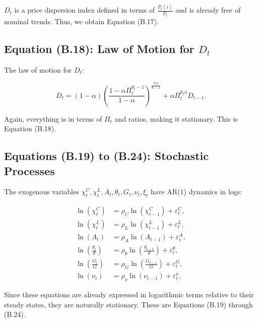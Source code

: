 \documentclass[12pt]{article}
\begin{document}
\( D_t \) is a price dispersion index defined in terms of \( \frac{P_t(i)}{P_t} \) and is already free of nominal trends. Thus, we obtain Equation (B.17).


\subsection{Equation (B.18): Law of Motion for \(D_t\)}

The law of motion for \( D_t \):

\[
D_t = (1-\alpha)\left(\frac{1-\alpha \Pi_t^{\theta_t-1}}{1-\alpha}\right)^{\frac{\theta_t \phi}{\theta_t - 1}} + \alpha \Pi_t^{\theta_t \phi} D_{t-1}.
\]

Again, everything is in terms of \( \Pi_t \) and ratios, making it stationary. This is Equation (B.18).


\subsection{Equations (B.19) to (B.24): Stochastic Processes}

The exogenous variables \( \chi_t^C, \chi_t^L, A_t, \theta_t, G_t, \nu_t, \xi_t \) have AR(1) dynamics in logs:

\begin{align}
    \ln \left(\chi_{t}^{C}\right) &= \rho_{C} \ln \left(\chi_{t-1}^{C}\right) + \varepsilon_{t}^{C}, \tag{B.19} \\
    \ln \left(\chi_{t}^{L}\right) &= \rho_{L} \ln \left(\chi_{t-1}^{L}\right) + \varepsilon_{t}^{L}, \tag{B.20} \\
    \ln \left(A_{t}\right) &= \rho_{A} \ln \left(A_{t-1}\right) + \varepsilon_{t}^{A}, \tag{B.21} \\
    \ln \left(\frac{\theta_{t}}{\theta}\right) &= \rho_{\theta} \ln \left(\frac{\theta_{t-1}}{\theta}\right) + \varepsilon_{t}^{\theta}, \tag{B.22} \\
    \ln \left(\frac{G_{t}}{G}\right) &= \rho_{G} \ln \left(\frac{G_{t-1}}{G}\right) + \varepsilon_{t}^{G}, \tag{B.23} \\
    \ln \left(\nu_{t}\right) &= \rho_{\nu} \ln \left(\nu_{t-1}\right) + \varepsilon_{t}^{\nu}, \tag{B.24}
\end{align}

Since these equations are already expressed in logarithmic terms relative to their steady states, they are naturally stationary. These are Equations (B.19) through (B.24).



\newpage
\end{document}
